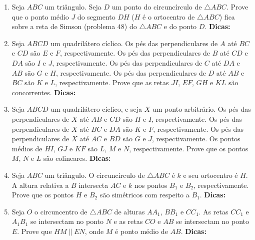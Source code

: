 \documentclass{article}
\newcommand{\dica}{\textbf{Dicas:}}
\newcommand{\iniTri}{Seja $ABC$ um triângulo}
\begin{document}
\begin{multicols}{2}
\begin{enumerate}
    \item \iniTri. Seja $D$ um ponto do circuncírculo de $\triangle ABC$. Prove que o ponto médio $J$ do segmento $DH$ ($H$ é o ortocentro de $\triangle ABC$) fica sobre a reta de Simson (problema $48$) do $\triangle ABC$ e do ponto $D$. \dica %
    
    \item Seja $ABCD$ um quadrilátero cíclico. Os pés das perpendiculares de $A$ até $BC$ e $CD$ são $E$ e $F$, respectivamente. Os pés das perpendiculares de $B$ até $CD$ e $DA$ são $I$ e $J$, respectivamente. Os pés das perpendiculares de $C$ até $DA$ e $AB$ são $G$ e $H$, respectivamente. Os pés das perpendiculares de $D$ até $AB$ e $BC$ são $K$ e $L$, respectivamente. Prove que as retas $JI$, $EF$, $GH$ e $KL$ são concorrentes. \dica %
    
    \item Seja $ABCD$ um quadrilátero cíclico, e seja $X$ um ponto arbitrário. Os pés das perpendiculares de $X$ até $AB$ e $CD$ são $H$ e $I$, respectivamente. Os pés das perpendiculares de $X$ até $BC$ e $DA$ são $K$ e $F$, respectivamente. Os pés das perpendiculares de $X$ até $AC$ e $BD$ são $G$ e $J$, respectivamente. Os pontos médios de $HI$, $GJ$ e $KF$ são $L$, $M$ e $N$, respectivamente. Prove que os pontos $M$, $N$ e $L$ são colineares. \dica %
    
    \item \iniTri. O circuncírculo de $\triangle ABC$ é $k$ e seu ortocentro é $H$. A altura relativa a $B$ intersecta $AC$ e $k$ nos pontos $B_1$ e $B_2$, respectivamente. Prove que os pontos $H$ e $B_2$ são simétricos com respeito a $B_1$. \dica %
    
    \item Seja $O$ o circuncentro de $\triangle ABC$ de alturas $AA_1$, $BB_1$ e $CC_1$. As retas $CC_1$ e $A_1B_1$ se intersectam no ponto $N$ e as retas $CO$ e $AB$ se intersectam no ponto $E$. Prove que $HM\parallel EN$, onde $M$ é ponto médio de $AB$. \dica %
    

\end{enumerate}
\end{multicols}
\end{document}
